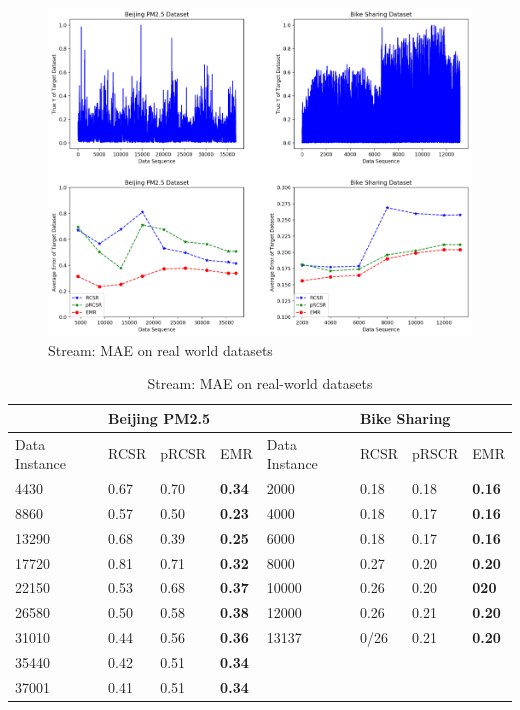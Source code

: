 \documentclass[conference,compsoc]{IEEEtran}
\begin{document}
\begin{figure} [h]
\centering
\includegraphics{fig_streamview_rel.eps}
\caption{Stream: MAE on real world datasets}
\label{fig:streamview_real}
\end{figure}

\begin{table}
\centering
\caption{Stream: MAE on real-world datasets}
\label{tab3}
\begin{tabular}{|l|l|l|l|l|l|l|l|}
\hline
              & \multicolumn{3}{l|}{Beijing PM2.5} &               & \multicolumn{3}{l|}{Bike Sharing} \\ \hline
Data Instance & RCSR   & pRCSR   & EMR             & Data Instance & RCSR   & pRSCR   & EMR            \\ \hline
4430          & 0.67   & 0.70    & \textbf{0.34}   & 2000          & 0.18   & 0.18    & \textbf{0.16}  \\ \hline
8860          & 0.57   & 0.50    & \textbf{0.23}   & 4000          & 0.18   & 0.17    & \textbf{0.16}  \\ \hline
13290         & 0.68   & 0.39    & \textbf{0.25}   & 6000          & 0.18   & 0.17    & \textbf{0.16}  \\ \hline
17720         & 0.81   & 0.71    & \textbf{0.32}   & 8000          & 0.27   & 0.20    & \textbf{0.20}  \\ \hline
22150         & 0.53   & 0.68    & \textbf{0.37}   & 10000         & 0.26   & 0.20    & \textbf{020}   \\ \hline
26580         & 0.50   & 0.58    & \textbf{0.38}            & 12000         & 0.26   & 0.21    & \textbf{0.20}  \\ \hline
31010         & 0.44   & 0.56    & \textbf{0.36}   & 13137         & 0/26   & 0.21    & \textbf{0.20}  \\ \hline
35440         & 0.42   & 0.51    & \textbf{0.34}   &               &        &         &                \\ \hline
37001         & 0.41   & 0.51    & \textbf{0.34}   &               &        &         &                \\ \hline
\end{tabular}
\end{table}
\end{document}
